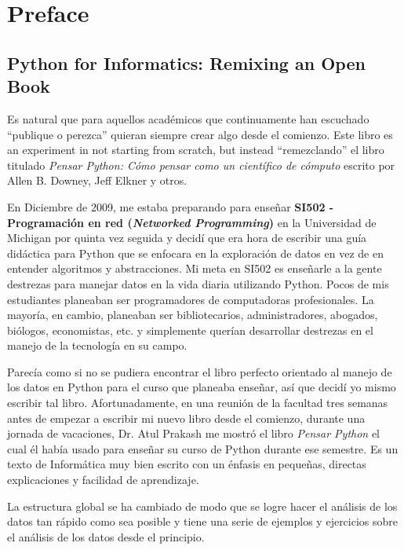 
\chapter{Preface}

\section*{Python for Informatics: Remixing an Open Book}

Es natural que para aquellos acad\'emicos que continuamente han escuchado ``publique o perezca'' quieran siempre crear algo desde el comienzo. Este libro es  an 
experiment in not starting from scratch, but instead ``remezclando''
el libro titulado
\emph{Pensar Python: C\'omo pensar como un cient\'ifico de c\'omputo}
escrito por Allen B. Downey, Jeff Elkner y otros.

En Diciembre de 2009, me estaba preparando para ense\~nar
{\bf SI502 - Programaci\'on en red (\textit{Networked Programming})} en la Universidad de Michigan
por quinta vez seguida y decid\'i que era hora de escribir una gu\'ia did\'actica para Python que se enfocara en la exploraci\'on de datos en vez de en entender algoritmos y abstracciones.
Mi meta en SI502 es ense\~narle a la gente destrezas para manejar datos en la vida diaria utilizando Python. Pocos de mis estudiantes planeaban ser programadores de computadoras profesionales. La mayor\'ia, en cambio, planeaban ser bibliotecarios, administradores, abogados, bi\'ologos, economistas, etc. y simplemente quer\'ian desarrollar destrezas en el manejo de la tecnolog\'ia en su campo.

Parec\'ia como si no se pudiera encontrar el libro perfecto orientado al manejo de los datos en Python para el curso que planeaba ense\~nar, as\'i que decid\'i yo mismo escribir tal libro. 
Afortunadamente, en una reuni\'on de la facultad tres semanas antes de empezar a escribir mi nuevo libro desde el comienzo, durante una jornada de vacaciones, Dr. Atul Prakash me mostr\'o el libro \emph{Pensar Python} el cual \'el hab\'ia usado para ense\~nar su curso de Python durante ese semestre.  
Es un texto de Inform\'atica muy bien escrito con un \'enfasis en peque\~nas, directas explicaciones y facilidad de aprendizaje.  

La estructura global se ha cambiado de modo que se logre hacer el an\'alisis de los datos tan r\'apido como sea posible y tiene una serie de ejemplos y ejercicios sobre el an\'alisis de los datos desde el principio.

